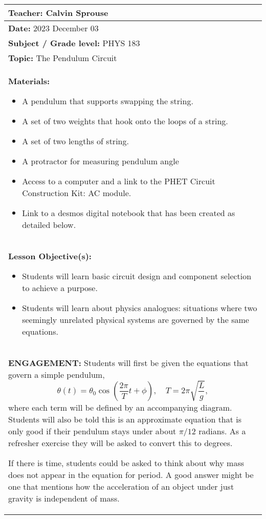 \documentclass[a4paper, 12pt]{../../config/homework}
\begin{document}
\begin{center}
\begin{tabularx}{\textwidth}{| >{\raggedright\arraybackslash}X |}
\hline
\textbf{Teacher:} Calvin Sprouse
\\\hline

\textbf{Date:} 2023 December 03
\\\hline

\textbf{Subject / Grade level:} PHYS 183
\\\hline

\textbf{Topic:} The Pendulum Circuit
\\\hline

\textbf{Materials:}
\begin{itemize}
\item A pendulum that supports swapping the string.
\item A set of two weights that hook onto the loops of a string.
\item A set of two lengths of string.
\item A protractor for measuring pendulum angle
\item Access to a computer and a link to the PHET Circuit Construction Kit: AC module.
\item Link to a desmos digital notebook that has been created as detailed below.
\end{itemize}
\\\hline

\textbf{Lesson Objective(s):}
\begin{itemize}
\item Students will learn basic circuit design and component selection to achieve a purpose.
\item Students will learn about physics analogues: situations where two seemingly unrelated physical systems are governed by the same equations.
\end{itemize}
\\\hline

\textbf{ENGAGEMENT:} Students will first be given the equations that govern a simple pendulum,
\[\theta(t) = \theta_0 \cos\left(\frac{2\pi}{T}t + \phi\right), \quad T=2\pi\sqrt{\frac{L}{g}},\]
where each term will be defined by an accompanying diagram. Students will also be told this is an approximate equation that is only good if their pendulum stays under about \(\pi/12\) radians. As a refresher exercise they will be asked to convert this to degrees.

If there is time, students could be asked to think about why mass does not appear in the equation for period. A good answer might be one that mentions how the acceleration of an object under just gravity is independent of mass.
\\\hline
\end{tabularx}


\end{center}
\end{document}
